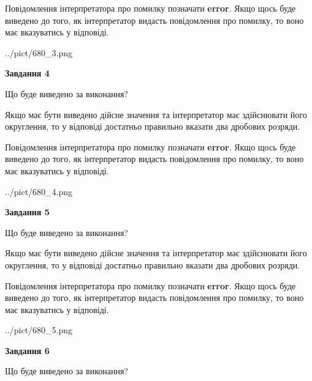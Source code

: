 \documentclass[12pt, ukrainian]{article}
\begin{document}
{\begin {Large}
Повідомлення інтерпретатора про помилку позначати \textbf{error}.
Якщо щось буде виведено до того, як інтерпретатор видасть повідомлення про помилку, 
то воно має вказуватись у відповіді. \par

\begin{center}
	{../pict/680_3.png}
\end{center}
\newpage

{\begin {center}\textbf{Завдання 4}\end {center}}\par
Що буде виведено за виконання? \par

Якщо має бути виведено дійсне значення та інтерпретатор має здійснювати його округлення, 
то у відповіді достатньо правильно вказати два дробових розряди.

Повідомлення інтерпретатора про помилку позначати \textbf{error}.
Якщо щось буде виведено до того, як інтерпретатор видасть повідомлення про помилку, 
то воно має вказуватись у відповіді. \par

\begin{center}
	{../pict/680_4.png}
\end{center}
\newpage

{\begin {center}\textbf{Завдання 5}\end {center}}\par
Що буде виведено за виконання? \par

Якщо має бути виведено дійсне значення та інтерпретатор має здійснювати його округлення, 
то у відповіді достатньо правильно вказати два дробових розряди.

Повідомлення інтерпретатора про помилку позначати \textbf{error}.
Якщо щось буде виведено до того, як інтерпретатор видасть повідомлення про помилку, 
то воно має вказуватись у відповіді. \par

\begin{center}
	{../pict/680_5.png}
\end{center}
\newpage

{\begin {center}\textbf{Завдання 6}\end {center}}\par
Що буде виведено за виконання? \par


\end{Large}}
\end{document}
